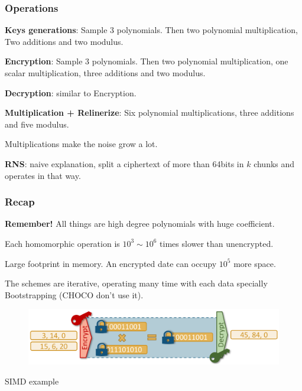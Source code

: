 \documentclass[10pt,handout]{beamer}
\begin{document}
\begin{frame}
\frametitle{Operations}

    \textbf{Keys generations}: Sample 3 polynomials. Then two polynomial multiplication, Two additions and two modulus.

    \textbf{Encryption}: Sample 3 polynomials. Then two polynomial multiplication, one scalar multiplication, three additions and two modulus.

    \textbf{Decryption}: similar to Encryption.

    \textbf{Multiplication + Relinerize}: Six polynomial multiplications, three additions and five modulus.

   Multiplications make the noise grow a lot.

    \textbf{RNS}: naive explanation, split a ciphertext of more than 64bits in $k$ chunks and operates in that way.

\end{frame}



\begin{frame}
\frametitle{Recap}

    \textbf{Remember!} All things are high degree polynomials with huge coefficient.


Each homomorphic operation is $10^3 \sim 10^6$ times slower than unencrypted.
\pause

Large footprint in memory.
An encrypted date can occupy $10^5$ more space.

\pause
    The schemes are iterative, operating many time with each data specially Bootstrapping (CHOCO don't use it).

        \begin{figure}[h!]
            \centering
            \includegraphics[scale=0.8]{workflow.png}
        \end{figure}
    \centering
        SIMD example


\end{frame}
\end{document}

